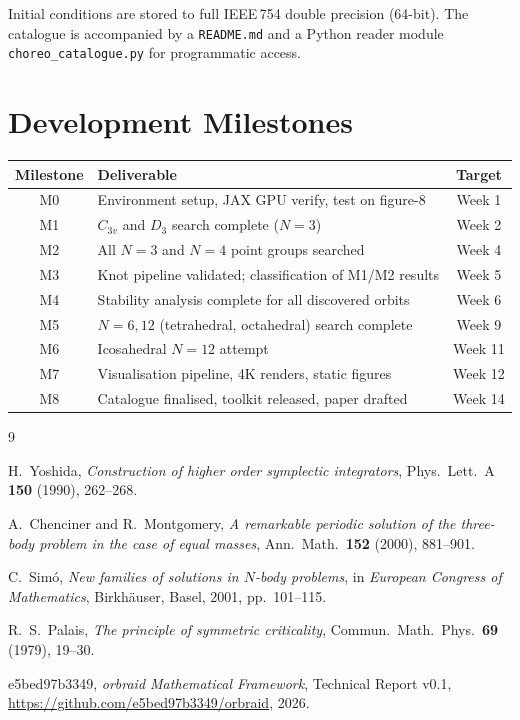 \documentclass[12pt, a4paper]{article}
\theoremstyle{definition}
\begin{document}
Initial conditions are stored to full IEEE\,754 double precision (64-bit).
The catalogue is accompanied by a \texttt{README.md} and a Python reader
module \texttt{choreo\_catalogue.py} for programmatic access.

\section{Development Milestones}

\begin{center}
\begin{tabular}{clc}
\toprule
\textbf{Milestone} & \textbf{Deliverable} & \textbf{Target} \\
\midrule
M0 & Environment setup, JAX GPU verify, test on figure-8 & Week 1 \\
M1 & $C_{3v}$ and $D_3$ search complete ($N=3$)           & Week 2 \\
M2 & All $N=3$ and $N=4$ point groups searched            & Week 4 \\
M3 & Knot pipeline validated; classification of M1/M2 results & Week 5 \\
M4 & Stability analysis complete for all discovered orbits & Week 6 \\
M5 & $N=6,12$ (tetrahedral, octahedral) search complete   & Week 9 \\
M6 & Icosahedral $N=12$ attempt                           & Week 11 \\
M7 & Visualisation pipeline, 4K renders, static figures   & Week 12 \\
M8 & Catalogue finalised, toolkit released, paper drafted & Week 14 \\
\bottomrule
\end{tabular}
\end{center}

\begin{thebibliography}{9}

H.~Yoshida,
\textit{Construction of higher order symplectic integrators},
Phys.\ Lett.\ A \textbf{150} (1990), 262--268.

A.~Chenciner and R.~Montgomery,
\textit{A remarkable periodic solution of the three-body problem in the case of equal masses},
Ann.\ Math.\ \textbf{152} (2000), 881--901.

C.~Sim\'o,
\textit{New families of solutions in $N$-body problems},
in \textit{European Congress of Mathematics}, Birkh\"auser, Basel, 2001, pp.\ 101--115.

R.~S.~Palais,
\textit{The principle of symmetric criticality},
Commun.\ Math.\ Phys.\ \textbf{69} (1979), 19--30.

e5bed97b3349,
\textit{orbraid Mathematical Framework},
Technical Report v0.1, \url{https://github.com/e5bed97b3349/orbraid}, 2026.

\end{thebibliography}
\end{document}
